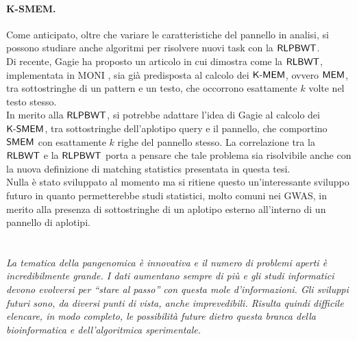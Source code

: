 \paragraph{K-SMEM.}
Come anticipato, oltre che variare le caratteristiche del pannello in analisi,
si possono studiare anche algoritmi per risolvere nuovi task con la
$\mbox{\rm {\sf RLPBWT}}$.\\ 
Di recente, Gagie \cite{kmems} ha proposto un articolo in cui dimostra come
la $\mbox{\rm {\sf RLBWT}}$, implementata in MONI \cite{moni}, sia già predisposta al
calcolo dei $\mbox{\rm {\sf K-MEM}}$, ovvero $\mbox{\rm {\sf MEM}}$, tra sottostringhe di un
pattern e un testo, che occorrono esattamente $k$ volte nel testo stesso.\\
In merito alla $\mbox{\rm {\sf RLPBWT}}$, si potrebbe adattare l'idea di Gagie al calcolo
dei $\mbox{\rm {\sf K-SMEM}}$, tra sottostringhe dell'aplotipo query e il pannello, che
comportino $\mbox{\rm {\sf SMEM}}$ con esattamente $k$ righe del pannello stesso. La
correlazione tra la $\mbox{\rm {\sf RLBWT}}$ e la $\mbox{\rm {\sf RLPBWT}}$ 
porta a pensare che tale problema sia risolvibile anche con la nuova definizione
di matching statistics presentata in questa tesi.\\
Nulla è stato sviluppato al momento ma si ritiene questo
un'interessante sviluppo futuro in quanto permetterebbe studi statistici, molto
comuni nei GWAS, in merito alla presenza di sottostringhe di un
aplotipo esterno all'interno di un pannello di aplotipi.\\
\\
\\
\textit{La tematica della \emph{pangenomica} è innovativa e il numero di
problemi aperti è incredibilmente grande. I dati aumentano sempre di più e gli
studi informatici devono evolversi per ``stare al passo'' con questa mole
d'informazioni. Gli \emph{sviluppi futuri} sono, da diversi punti di vista,
anche imprevedibili. Risulta quindi difficile elencare, in modo completo, le
possibilità future dietro questa branca della bioinformatica e dell'algoritmica
sperimentale.}
